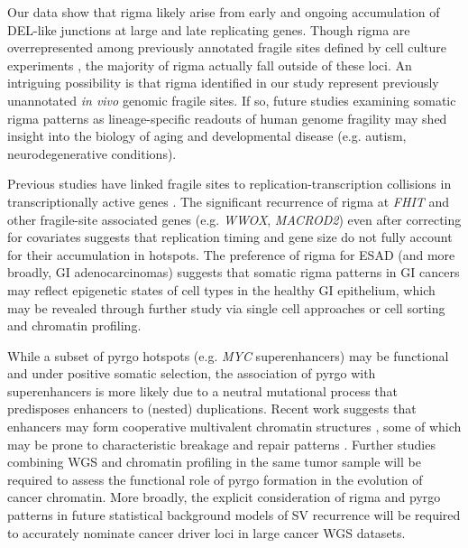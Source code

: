 \documentclass[phd,tocprelim]{cornell}
\begin{document}
Our data show that rigma likely arise from early and ongoing accumulation of DEL-like junctions at large and late replicating genes.  Though rigma are overrepresented among  previously annotated fragile sites defined by cell culture experiments \cite{schwartz2006,fungtammasan2012, ohta1996, Ma2012-ym}, the majority of rigma actually fall outside of these loci.  An intriguing possibility is that rigma identified in our study represent previously unannotated \textit{in vivo} genomic fragile sites. If so, future studies examining somatic rigma patterns as lineage-specific readouts of human genome fragility may shed insight into the biology of aging and developmental disease (e.g. autism, neurodegenerative conditions).

Previous studies have linked fragile sites to replication-transcription collisions in transcriptionally active genes \cite{Helmrich2011-yj,Wilson2015-zg,Blin2019-kf}.  The significant recurrence of rigma at \textit{FHIT} and other fragile-site associated genes (e.g. \textit{WWOX}, \textit{MACROD2}) even after correcting for covariates suggests that replication timing and gene size do not fully account for their accumulation in hotspots.   The preference of rigma for ESAD (and more broadly, GI adenocarcinomas) suggests that somatic rigma patterns in GI cancers may reflect epigenetic states of cell types in the healthy GI epithelium, which may be revealed through further study via single cell approaches or cell sorting and chromatin profiling.

While  a subset of pyrgo hotspots (e.g. \textit{MYC} superenhancers) may be functional and under positive somatic selection, the association of pyrgo with superenhancers is more likely due to a neutral mutational process that predisposes enhancers to (nested) duplications.  Recent work suggests that enhancers may form cooperative multivalent chromatin structures \cite{Hnisz:2017fz}, some of which may be prone to characteristic breakage and repair patterns \cite{canela2017}. Further studies combining WGS and chromatin profiling in the same tumor sample will be required to assess the functional role of pyrgo formation in the evolution of cancer chromatin.  More broadly, the explicit consideration of rigma and pyrgo patterns in future statistical background models of SV recurrence will be required to accurately nominate cancer driver loci in large cancer WGS datasets.
\end{document}
